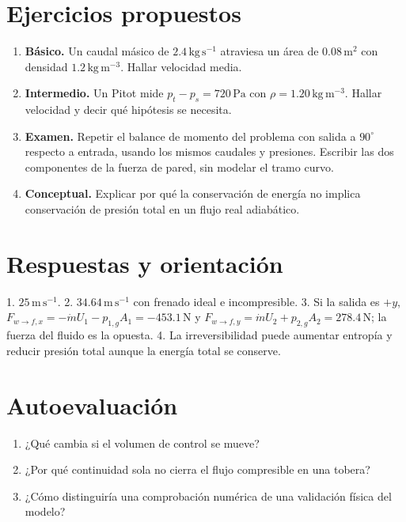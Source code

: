 \section{Ejercicios propuestos}
\begin{enumerate}
\item \textbf{Básico.} Un caudal másico de $2.4\,\mathrm{kg\,s^{-1}}$ atraviesa un área de $0.08\,\mathrm{m^2}$ con densidad $1.2\,\mathrm{kg\,m^{-3}}$. Hallar velocidad media.
\item \textbf{Intermedio.} Un Pitot mide $p_t-p_s=720\,\mathrm{Pa}$ con $\rho=1.20\,\mathrm{kg\,m^{-3}}$. Hallar velocidad y decir qué hipótesis se necesita.
\item \textbf{Examen.} Repetir el balance de momento del problema con salida a $90^\circ$ respecto a entrada, usando los mismos caudales y presiones. Escribir las dos componentes de la fuerza de pared, sin modelar el tramo curvo.
\item \textbf{Conceptual.} Explicar por qué la conservación de energía no implica conservación de presión total en un flujo real adiabático.
\end{enumerate}
\section{Respuestas y orientación}
1. $25\,\mathrm{m\,s^{-1}}$. 2. $34.64\,\mathrm{m\,s^{-1}}$ con frenado ideal e incompresible. 3. Si la salida es $+y$, $F_{w\to f,x}=-\dot mU_1-p_{1,g}A_1=-453.1\,\mathrm{N}$ y $F_{w\to f,y}=\dot mU_2+p_{2,g}A_2=278.4\,\mathrm{N}$; la fuerza del fluido es la opuesta. 4. La irreversibilidad puede aumentar entropía y reducir presión total aunque la energía total se conserve.

\section{Autoevaluación}
\begin{enumerate}
\item ¿Qué cambia si el volumen de control se mueve?
\item ¿Por qué continuidad sola no cierra el flujo compresible en una tobera?
\item ¿Cómo distinguiría una comprobación numérica de una validación física del modelo?
\end{enumerate}


\studiumchaptercheck
